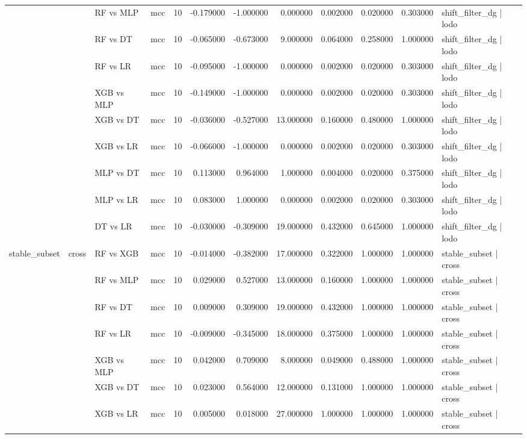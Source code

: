 \begin{tabular}{llllrrrrrrrl}
 &  & RF vs MLP & mcc & 10 & -0.179000 & -1.000000 & 0.000000 & 0.002000 & 0.020000 & 0.303000 & shift_filter_dg | lodo \\
 &  & RF vs DT & mcc & 10 & -0.065000 & -0.673000 & 9.000000 & 0.064000 & 0.258000 & 1.000000 & shift_filter_dg | lodo \\
 &  & RF vs LR & mcc & 10 & -0.095000 & -1.000000 & 0.000000 & 0.002000 & 0.020000 & 0.303000 & shift_filter_dg | lodo \\
 &  & XGB vs MLP & mcc & 10 & -0.149000 & -1.000000 & 0.000000 & 0.002000 & 0.020000 & 0.303000 & shift_filter_dg | lodo \\
 &  & XGB vs DT & mcc & 10 & -0.036000 & -0.527000 & 13.000000 & 0.160000 & 0.480000 & 1.000000 & shift_filter_dg | lodo \\
 &  & XGB vs LR & mcc & 10 & -0.066000 & -1.000000 & 0.000000 & 0.002000 & 0.020000 & 0.303000 & shift_filter_dg | lodo \\
 &  & MLP vs DT & mcc & 10 & 0.113000 & 0.964000 & 1.000000 & 0.004000 & 0.020000 & 0.375000 & shift_filter_dg | lodo \\
 &  & MLP vs LR & mcc & 10 & 0.083000 & 1.000000 & 0.000000 & 0.002000 & 0.020000 & 0.303000 & shift_filter_dg | lodo \\
 &  & DT vs LR & mcc & 10 & -0.030000 & -0.309000 & 19.000000 & 0.432000 & 0.645000 & 1.000000 & shift_filter_dg | lodo \\
\cline{1-12} \cline{2-12}
\multirow[t]{20}{*}{stable_subset} & \multirow[t]{10}{*}{cross} & RF vs XGB & mcc & 10 & -0.014000 & -0.382000 & 17.000000 & 0.322000 & 1.000000 & 1.000000 & stable_subset | cross \\
 &  & RF vs MLP & mcc & 10 & 0.029000 & 0.527000 & 13.000000 & 0.160000 & 1.000000 & 1.000000 & stable_subset | cross \\
 &  & RF vs DT & mcc & 10 & 0.009000 & 0.309000 & 19.000000 & 0.432000 & 1.000000 & 1.000000 & stable_subset | cross \\
 &  & RF vs LR & mcc & 10 & -0.009000 & -0.345000 & 18.000000 & 0.375000 & 1.000000 & 1.000000 & stable_subset | cross \\
 &  & XGB vs MLP & mcc & 10 & 0.042000 & 0.709000 & 8.000000 & 0.049000 & 0.488000 & 1.000000 & stable_subset | cross \\
 &  & XGB vs DT & mcc & 10 & 0.023000 & 0.564000 & 12.000000 & 0.131000 & 1.000000 & 1.000000 & stable_subset | cross \\
 &  & XGB vs LR & mcc & 10 & 0.005000 & 0.018000 & 27.000000 & 1.000000 & 1.000000 & 1.000000 & stable_subset | cross \\

\end{tabular}
